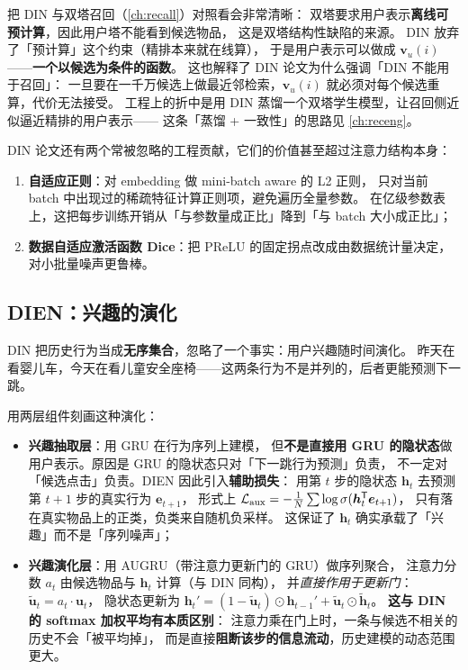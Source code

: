 \begin{insight}
把 DIN 与双塔召回（\cref{ch:recall}）对照看会非常清晰：
双塔要求用户表示\textbf{离线可预计算}，因此用户塔不能看到候选物品，
这是双塔结构性缺陷的来源。
DIN 放弃了「预计算」这个约束（精排本来就在线算），
于是用户表示可以做成 $\bm{v}_u(i)$——\textbf{一个以候选为条件的函数}。
这也解释了 DIN 论文为什么强调「DIN 不能用于召回」：
一旦要在一千万候选上做最近邻检索，$\bm{v}_u(i)$ 就必须对每个候选重算，代价无法接受。
工程上的折中是用 DIN 蒸馏一个双塔学生模型，让召回侧近似逼近精排的用户表示——
这条「蒸馏 + 一致性」的思路见 \cref{ch:receng}。
\end{insight}

DIN 论文还有两个常被忽略的工程贡献，它们的价值甚至超过注意力结构本身：

\begin{enumerate}
  \item \textbf{自适应正则}：对 embedding 做 mini-batch aware 的 L2 正则，
        只对当前 batch 中出现过的稀疏特征计算正则项，避免遍历全量参数。
        在亿级参数表上，这把每步训练开销从「与参数量成正比」降到「与 batch 大小成正比」；
  \item \textbf{数据自适应激活函数 Dice}：把 PReLU 的固定拐点改成由数据统计量决定，
        对小批量噪声更鲁棒。
\end{enumerate}

\subsection{DIEN：兴趣的演化}

DIN 把历史行为当成\textbf{无序集合}，忽略了一个事实：用户兴趣随时间演化。
昨天在看婴儿车，今天在看儿童安全座椅——这两条行为不是并列的，后者更能预测下一跳。

 \cite{zhou2019dien}
用两层组件刻画这种演化：

\begin{itemize}
  \item \textbf{兴趣抽取层}：用 GRU 在行为序列上建模，
        但\textbf{不是直接用 GRU 的隐状态}做用户表示。原因是 GRU 的隐状态只对「下一跳行为预测」负责，
        不一定对「候选点击」负责。DIEN 因此引入\textbf{辅助损失}：
        用第 $t$ 步的隐状态 $\bm{h}_t$ 去预测第 $t+1$ 步的真实行为 $\bm{e}_{t+1}$，
        形式上 $\mathcal{L}_{\mathrm{aux}} = -\frac{1}{N}\sum \log \operatorname{\sigma}(\bm{h}_t^{\mathsf{T}} \bm{e}_{t+1})$，
        只有落在真实物品上的正类，负类来自随机负采样。
        这保证了 $\bm{h}_t$ 确实承载了「兴趣」而不是「序列噪声」；
  \item \textbf{兴趣演化层}：用 AUGRU（带注意力更新门的 GRU）做序列聚合，
        注意力分数 $a_t$ 由候选物品与 $\bm{h}_t$ 计算（与 DIN 同构），
        并\emph{直接作用于更新门}：
        $\tilde{\bm{u}}_t = a_t \cdot \bm{u}_t$，
        隐状态更新为 $\bm{h}_t' = (1 - \tilde{\bm{u}}_t) \odot \bm{h}_{t-1}' + \tilde{\bm{u}}_t \odot \tilde{\bm{h}}_t$。
        \textbf{这与 DIN 的 softmax 加权平均有本质区别}：
        注意力乘在门上时，一条与候选不相关的历史不会「被平均掉」，
        而是直接\textbf{阻断该步的信息流动}，历史建模的动态范围更大。
\end{itemize}

